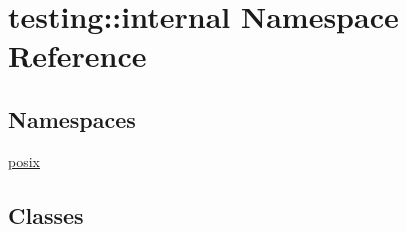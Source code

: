 \hypertarget{namespacetesting_1_1internal}{\section{testing\-:\-:internal Namespace Reference}
\label{namespacetesting_1_1internal}
}
\subsection*{Namespaces}
\begin{DoxyCompactItemize}
\item 
\hyperlink{namespacetesting_1_1internal_1_1posix}{posix}
\end{DoxyCompactItemize}
\subsection*{Classes}
